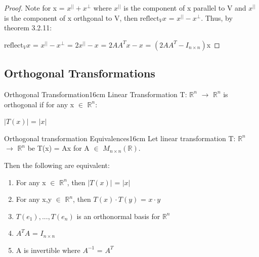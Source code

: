     \begin{proof}
        Note for x = $x^{||} + x^{\perp}$ where $x^{||}$ is the component of x
        parallel to V and $x^{||}$ is the component of x orthgonal to V, then
        $\text{reflect}_Vx$ = $x^{||} - x^{\perp}$.
        Thus, by {\color{red} theorem 3.2.11}:

        \hspace{0.5cm}
        $\text{reflect}_Vx$
        = $x^{||} - x^{\perp}$
        = $2x^{||} - x$
        = $2AA^Tx - x$
        = $(2AA^T - I_{n \times n})$x
    \end{proof}

    \newpage





\subsection{ Orthogonal Transformations }

    \begin{definition}{Orthogonal Transformation}{16cm}
        Linear Transformation T: $\mathbb{R}^n$ $\rightarrow$ $\mathbb{R}^n$
        is {\color{lblue} orthogonal} if for any x $\in$ $\mathbb{R}^n$:

        \hspace{0.5cm}
        $|T(x)|$ = $|x|$
    \end{definition}

    \vspace{0.5cm}

    

    \begin{wtheorem}{Orthogonal transformation Equivalences}{16cm}
        Let linear transformation T: $\mathbb{R}^n$ $\rightarrow$ $\mathbb{R}^n$
        be T(x) = Ax for A $\in$ $M_{n \times n}(\mathbb{R})$.

        Then the following are equivalent:

        \begin{enumerate}[label=(\alph*), leftmargin=1cm, itemsep=0.1cm]
            \item For any x $\in$ $\mathbb{R}^n$, then
                $|T(x)|$ = $|x|$

            \item For any x,y $\in$ $\mathbb{R}^n$, then
                $T(x) \cdot T(y)$ = $x \cdot y$

            \item $T(e_1),...,T(e_n)$ is an orthonormal basis for $\mathbb{R}^n$
            
            \item $A^TA$ = $I_{n \times n}$
            
            \item A is invertible where $A^{-1}$ = $A^T$
        \end{enumerate}
    \end{wtheorem}

